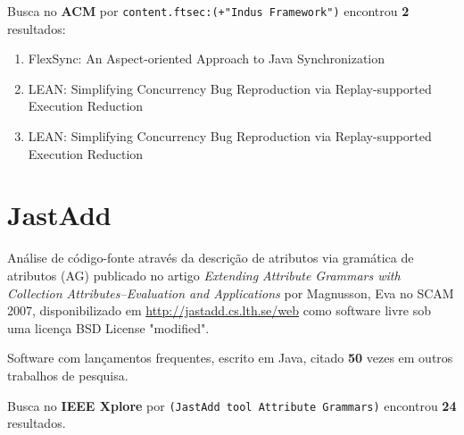 Busca no {\bf ACM} por
\texttt{content.ftsec:(+"Indus Framework")}
encontrou {\bf 2}
resultados:

\begin{enumerate}
\item FlexSync: An Aspect-oriented Approach to Java Synchronization
\item LEAN: Simplifying Concurrency Bug Reproduction via Replay-supported Execution Reduction
\item LEAN: Simplifying Concurrency Bug Reproduction via Replay-supported Execution Reduction
\end{enumerate}

\section{JastAdd}

Análise de código-fonte através da descrição de atributos via gramática de atributos (AG)
publicado no artigo {\it Extending Attribute Grammars with Collection Attributes--Evaluation and Applications}
por Magnusson, Eva
no SCAM 2007,
disponibilizado em \url{http://jastadd.cs.lth.se/web}
como software livre
sob uma licença BSD License "modified".

Software com lançamentos frequentes,
escrito em Java,
citado {\bf 50} vezes em outros trabalhos de pesquisa.

Busca no {\bf IEEE Xplore} por
\texttt{(JastAdd tool Attribute Grammars)}
encontrou {\bf 24}
resultados.

